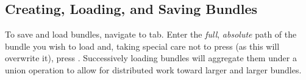 \subsection{Creating, Loading, and Saving Bundles}
\label{sec:iface:saving}

To save and load bundles, navigate to  tab.
Enter the \emph{full}, \emph{absolute} path of the bundle you wish to load and,
  taking special care not to press 
  (as this will overwrite it),
  press .
Successively loading bundles will aggregate them under a union operation
  to allow for distributed work toward larger and larger bundles.

